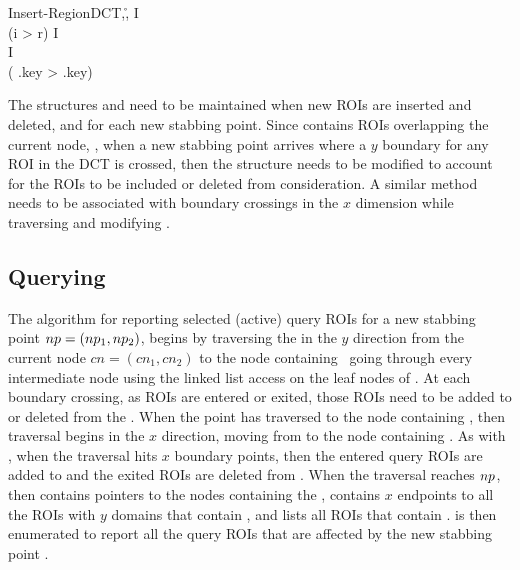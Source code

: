 \documentclass{ucdthesis}       %
\newcommand{\meth}{\negthickspace \rightarrow \negthickspace}
\newcommand{\METH}[2]{\meth\CALL{#1}{#2}}
\begin{document}
\begin{pseudocode}[ruled]{Insert-Region}{\ac{DCT},,\r}
\label{alg:insert}
  I \GETS {} \hfill {}\\
  \IF (i >  r) 
  \THEN {} \METH{insert}{\rid,\r}
  \ELSE 
  \BEGIN
    I \METH{insert}{\rin,\rid,\r}\\
    I \METH{insert}{\rix,\rid,\r}\\
    \IF (\rin \leq {} .key  \rix >  .key)
      \THEN {}
  \END
\ENDPROCEDURE
\MAIN
\ENDMAIN
\end{pseudocode}
   
The structures  and  need to be maintained when new
\acp{ROI} are inserted and deleted, and for each new stabbing point.
Since  contains \acp{ROI} overlapping the current node,
, when a new stabbing point arrives where a $y$ boundary for
any \ac{ROI} in the \ac{DCT} is crossed, then the  structure
needs to be modified to account for the \acp{ROI} to be included or
deleted from consideration.  A similar method needs to be associated
with boundary crossings in the $x$ dimension while traversing 
and modifying .

\subsection{Querying}

The algorithm for reporting selected (active) query \acp{ROI} for a new
stabbing point $np = (np_1,np_2)$, begins by traversing the  
 in the $y$ direction from the current node $cn=(cn_1,cn_2)$ to
the node containing \npy\ going through every intermediate node using
the linked list access on the leaf nodes of .  At each boundary
crossing, as \acp{ROI} are entered or exited, those \acp{ROI} need to be
added to or deleted from the  . When the point has traversed
to the node containing \npy, then traversal begins in the $x$
direction, moving from  to the node containing \npx.  As with ,
when the traversal hits $x$ boundary points, then the entered query
\acp{ROI} are added to  and the exited \acp{ROI} are deleted from .
When the traversal reaches $np$, then  contains pointers to the
nodes containing the \np,  contains $x$ endpoints to all the
\acp{ROI} with $y$ domains that contain \npy, and  lists all \acp{ROI}
that contain \np.   is then enumerated to report all the query
\acp{ROI} that are affected by the new stabbing point \np.
\end{document}

